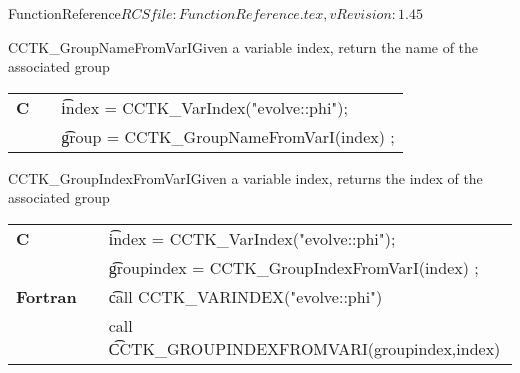 \begin{cactuspart}{5}{FunctionReference}{$RCSfile: FunctionReference.tex,v $}{$Revision: 1.45 $}
\begin{CCTKFunc}{CCTK\_GroupNameFromVarI}{Given a variable index, return the name of the associated group}
\label{CCTK-GroupNameFromVarI}
\showcargs
\begin{params}
\end{params}
\begin{discussion}
\end{discussion}
\begin{examples}
\begin{tabular}{@{}p{3cm}cp{11cm}}
\hfill {\bf C} && {\t index = CCTK\_VarIndex("evolve::phi");} \\
               && {\t group = CCTK\_GroupNameFromVarI(index) ;}
\\
\end{tabular}
\end{examples}
\begin{errorcodes}
\end{errorcodes}
\end{CCTKFunc}



\begin{CCTKFunc}{CCTK\_GroupIndexFromVarI}{Given a variable index, returns the index of the associated group}
\label{CCTK-GroupIndexFromVarI}
\showargs
\begin{params}
\end{params}
\begin{discussion}
\end{discussion}
\begin{examples}
\begin{tabular}{@{}p{3cm}cp{11cm}}
\hfill {\bf C} && {\t index = CCTK\_VarIndex("evolve::phi");} \\
               && {\t groupindex = CCTK\_GroupIndexFromVarI(index) ;}
\\
\hfill {\bf Fortran} && {\t call CCTK\_VARINDEX("evolve::phi")}\\
                     &&call {\t CCTK\_GROUPINDEXFROMVARI(groupindex,index)}
\\
\end{tabular}
\end{examples}
\begin{errorcodes}
\end{errorcodes}
\end{CCTKFunc}




\end{cactuspart}
